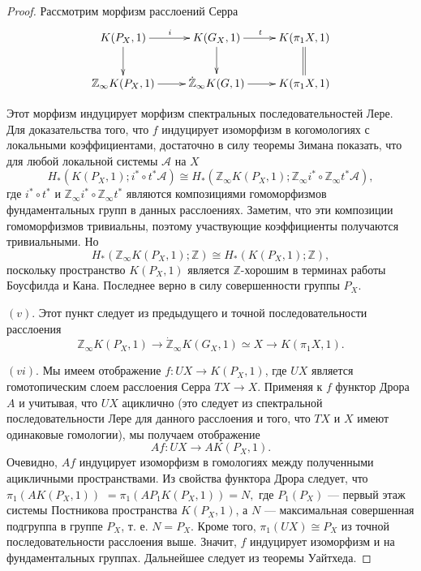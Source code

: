 \documentclass[14pt, dvipsnames, twoside]{extarticle}
\theoremstyle{definition}
\theoremstyle{remark}
\begin{document}
\begin{proof}

Рассмотрим морфизм расслоений Серра $$\xymatrix{
    K(P_X, 1) \ar[r]^{i} \ar[d] & K(G_X, 1) \ar[d] \ar[r]^{t} &  K(\pi_1X, 1) \ar@{=}[d] \\
    \mathbb{Z}_\infty K(P_X, 1) \ar[r]       & \dot{\mathbb{Z}}_\infty K(G, 1) \ar[r] &K(\pi_1X, 1) }$$ 
    
Этот морфизм индуцирует морфизм спектральных последовательностей Лере. Для доказательства того, что $f$ индуцирует изоморфизм в когомологиях с локальными коэффициентами, достаточно в силу теоремы Зимана показать, что для любой локальной системы $\mathcal{A}$ на $X$ $$H_\ast(K(P_X, 1); i^\ast\circ t^\ast\mathcal{A})\cong H_\ast(\mathbb{Z}_\infty K(P_X, 1); \mathbb{Z}_\infty i^\ast\circ \mathbb{Z}_\infty t^\ast\mathcal{A}),$$ где $i^\ast\circ t^\ast$ и $\mathbb{Z}_\infty i^\ast\circ \mathbb{Z}_\infty t^\ast$ являются композициями гомоморфизмов фундаментальных групп в данных расслоениях. Заметим, что эти композиции гомоморфизмов тривиальны, поэтому участвующие коэффициенты получаются тривиальными. Но $$H_\ast(\mathbb{Z}_\infty K(P_X, 1); \mathbb{Z})\cong H_\ast(K(P_X, 1); \mathbb{Z}),$$ поскольку пространство $K(P_X, 1)$ является $\mathbb{Z}$-хорошим в терминах работы Боусфилда и Кана. Последнее верно в силу совершенности группы $P_X$.


$(v)$. Этот пункт следует из предыдущего и точной последовательности расслоения $$\mathbb{Z}_\infty K(P_X,1)\to \dot{\mathbb{Z}}_\infty K(G_X, 1)\simeq X\to K(\pi_1X, 1).$$


$(vi)$. Мы имеем отображение $f: UX\to K(P_X, 1)$, где $UX$ является гомотопическим слоем расслоения Серра $TX\to X$. Применяя к $f$ функтор Дрора $A$ и учитывая, что $UX$ ациклично (это следует из спектральной последовательности Лере для данного расслоения и того, что $TX$ и $X$ имеют одинаковые гомологии), мы получаем отображение $$Af: UX\to AK(P_X, 1).$$ Очевидно, $Af$ индуцирует изоморфизм в гомологиях между полученными ацикличными пространствами. Из свойства функтора Дрора следует, что $\pi_1(AK(P_X, 1))$ $= \pi_1(AP_1K(P_X, 1)) = N,$ где $P_1(P_X)$ --- первый этаж системы Постникова пространства $K(P_X, 1)$, а $N$ --- максимальная совершенная подгруппа в группе $P_X$, т. е. $N = P_X$. Кроме того, $\pi_1(UX)\cong P_X$ из точной последовательности расслоения выше. Значит, $f$ индуцирует изоморфизм и на фундаментальных группах. Дальнейшее следует из теоремы Уайтхеда.




\end{proof}
\end{document}
